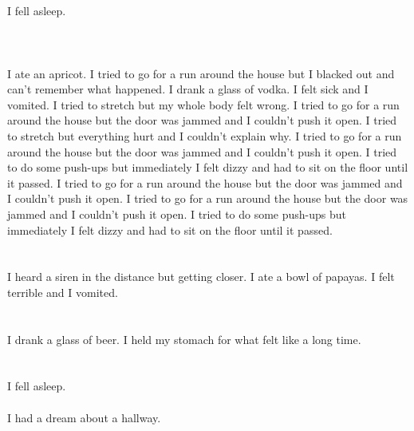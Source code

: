 \documentclass{article}
\begin{document}
    \section{}
    I fell asleep.\\\\ 
    \newpage
    
    \section{}
    I ate an apricot. I tried to go for a run around the house but I blacked out and can't remember what happened. I drank a glass of vodka. I felt sick and I vomited.  I tried to stretch but my whole body felt wrong.  I tried to go for a run around the house but the door was jammed and I couldn't push it open.  I tried to stretch but everything hurt and I couldn't explain why.  I tried to go for a run around the house but the door was jammed and I couldn't push it open.   I tried to do some push-ups but immediately I felt dizzy and had to sit on the floor until it passed.  I tried to go for a run around the house but the door was jammed and I couldn't push it open.  I tried to go for a run around the house but the door was jammed and I couldn't push it open.  I tried to do some push-ups but immediately I felt dizzy and had to sit on the floor until it passed.  
    \newpage
    
    \section{}
    I heard a siren in the distance but getting closer. I ate a bowl of papayas. I felt terrible and I vomited.  
    \newpage
    
    \section{}
    I drank a glass of beer. I held my stomach for what felt like a long time.  
    \newpage
    
    \section{}
    I fell asleep.\\\\I had a dream about a hallway.\\\\ 
    \newpage
    
\end{document}
